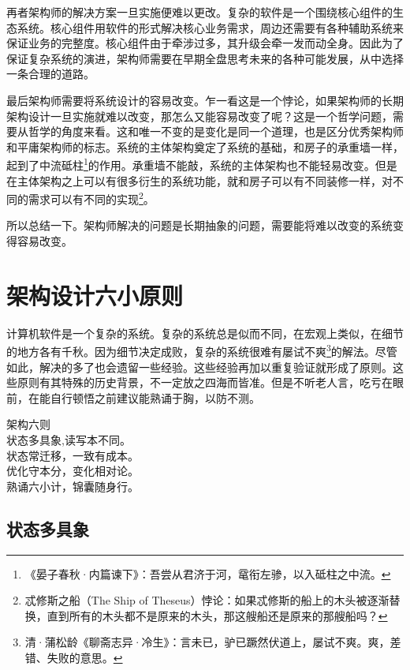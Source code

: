 再者架构师的解决方案一旦实施便难以更改。复杂的软件是一个围绕核心组件的生态系统。核心组件用软件的形式解决核心业务需求，周边还需要有各种辅助系统来保证业务的完整度。核心组件由于牵涉过多，其升级会牵一发而动全身。因此为了保证复杂系统的演进，架构师需要在早期全盘思考未来的各种可能发展，从中选择一条合理的道路。


最后架构师需要将系统设计的容易改变。乍一看这是一个悖论，如果架构师的长期架构设计一旦实施就难以改变，那怎么又能容易改变了呢？这是一个哲学问题，需要从哲学的角度来看。这和唯一不变的是变化是同一个道理，也是区分优秀架构师和平庸架构师的标志。系统的主体架构奠定了系统的基础，和房子的承重墙一样，起到了中流砥柱\footnote{《晏子春秋·内篇谏下》：吾尝从君济于河，鼋衔左骖，以入砥柱之中流。}的作用。承重墙不能敲，系统的主体架构也不能轻易改变。但是在主体架构之上可以有很多衍生的系统功能，就和房子可以有不同装修一样，对不同的需求可以有不同的实现\footnote{忒修斯之船（The Ship of Theseus）悖论：如果忒修斯的船上的木头被逐渐替换，直到所有的木头都不是原来的木头，那这艘船还是原来的那艘船吗？}。


所以总结一下。架构师解决的问题是长期抽象的问题，需要能将难以改变的系统变得容易改变。


\section{架构设计六小原则}

计算机软件是一个复杂的系统。复杂的系统总是似而不同，在宏观上类似，在细节的地方各有千秋。因为细节决定成败，复杂的系统很难有屡试不爽\footnote{清·蒲松龄《聊斋志异·冷生》：言未已，驴已蹶然伏道上，屡试不爽。爽，差错、失败的意思。}的解法。尽管如此，解决的多了也会遗留一些经验。这些经验再加以重复验证就形成了原则。这些原则有其特殊的历史背景，不一定放之四海而皆准。但是不听老人言，吃亏在眼前，在能自行顿悟之前建议能熟诵于胸，以防不测。

\begin{center}
    \begin{pinyinscope}
    架构六则\\
    状态多具象,读写本不同。\\
    状态常迁移，一致有成本。\\
    优化守本分，变化相对论。\\
    熟诵六小计，锦囊随身行。\\
    \end{pinyinscope}
\end{center}



\subsection{状态多具象}\label{statehasmultipleview}

